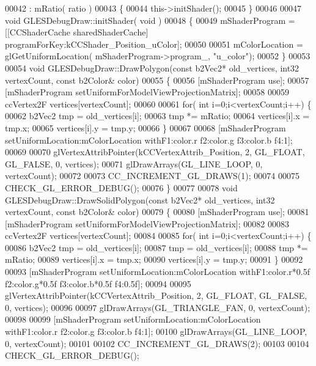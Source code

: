 \begin{DoxyCode}
00042 : mRatio( ratio )
00043 \{
00044     this->initShader();
00045 \}
00046 
00047 \textcolor{keywordtype}{void} GLESDebugDraw::initShader( \textcolor{keywordtype}{void} )
00048 \{
00049     mShaderProgram = [[CCShaderCache sharedShaderCache] programForKey:kCCShader\_Position\_uColor];
00050     
00051     mColorLocation = glGetUniformLocation( mShaderProgram->program\_, \textcolor{stringliteral}{"u\_color"});
00052 \}
00053 
00054 \textcolor{keywordtype}{void} GLESDebugDraw::DrawPolygon(\textcolor{keyword}{const} b2Vec2* old\_vertices, int32 vertexCount, \textcolor{keyword}{const} b2Color& color)
00055 \{
00056     [mShaderProgram use];
00057     [mShaderProgram setUniformForModelViewProjectionMatrix];
00058 
00059     ccVertex2F vertices[vertexCount];
00060 
00061     \textcolor{keywordflow}{for}( \textcolor{keywordtype}{int} i=0;i<vertexCount;i++) \{
00062         b2Vec2 tmp = old\_vertices[i];
00063         tmp *= mRatio;
00064         vertices[i].x = tmp.x;
00065         vertices[i].y = tmp.y;
00066     \}
00067 
00068     [mShaderProgram setUniformLocation:mColorLocation withF1:color.r f2:color.g f3:color.b f4:1];
00069 
00070     glVertexAttribPointer(kCCVertexAttrib\_Position, 2, GL\_FLOAT, GL\_FALSE, 0, vertices);
00071     glDrawArrays(GL\_LINE\_LOOP, 0, vertexCount);
00072 
00073     CC\_INCREMENT\_GL\_DRAWS(1);
00074 
00075     CHECK\_GL\_ERROR\_DEBUG();
00076 \}
00077 
00078 \textcolor{keywordtype}{void} GLESDebugDraw::DrawSolidPolygon(\textcolor{keyword}{const} b2Vec2* old\_vertices, int32 vertexCount, \textcolor{keyword}{const} b2Color& color)
00079 \{
00080     [mShaderProgram use];
00081     [mShaderProgram setUniformForModelViewProjectionMatrix];
00082 
00083     ccVertex2F vertices[vertexCount];
00084 
00085     \textcolor{keywordflow}{for}( \textcolor{keywordtype}{int} i=0;i<vertexCount;i++) \{
00086         b2Vec2 tmp = old\_vertices[i];
00087         tmp = old\_vertices[i];
00088         tmp *= mRatio;
00089         vertices[i].x = tmp.x;
00090         vertices[i].y = tmp.y;
00091     \}
00092 
00093     [mShaderProgram setUniformLocation:mColorLocation withF1:color.r*0.5f f2:color.g*0.5f f3:color.b*0.5f 
      f4:0.5f];
00094 
00095     glVertexAttribPointer(kCCVertexAttrib\_Position, 2, GL\_FLOAT, GL\_FALSE, 0, vertices);
00096 
00097     glDrawArrays(GL\_TRIANGLE\_FAN, 0, vertexCount);
00098 
00099     [mShaderProgram setUniformLocation:mColorLocation withF1:color.r f2:color.g f3:color.b f4:1];
00100     glDrawArrays(GL\_LINE\_LOOP, 0, vertexCount);
00101 
00102     CC\_INCREMENT\_GL\_DRAWS(2);
00103 
00104     CHECK\_GL\_ERROR\_DEBUG();

\end{DoxyCode}
